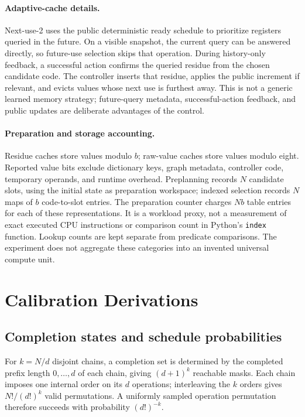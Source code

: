 \paragraph{Adaptive-cache details.}
Next-use-2 uses the public deterministic ready schedule to prioritize
registers queried in the future. On a visible snapshot, the current query
can be answered directly, so future-use selection skips that operation.
During history-only feedback, a successful action confirms the queried
residue from the chosen candidate code. The controller inserts that
residue, applies the public increment if relevant, and evicts values
whose next use is furthest away. This is not a generic learned memory
strategy; future-query metadata, successful-action feedback, and public
updates are deliberate advantages of the control.

\paragraph{Preparation and storage accounting.}
Residue caches store values modulo $b$; raw-value caches store values
modulo eight. Reported value bits exclude dictionary keys, graph metadata,
controller code, temporary operands, and runtime overhead. Preplanning
records $N$ candidate slots, using the initial state as preparation
workspace; indexed selection records $N$ maps of $b$ code-to-slot entries.
The preparation counter charges $Nb$ table entries for each of these
representations. It is a workload proxy, not a measurement of exact executed
CPU instructions or comparison count in Python's \texttt{index} function.
Lookup counts are kept separate from predicate comparisons. The experiment
does not aggregate these categories into an invented universal compute unit.

\section{Calibration Derivations}
\label{app:proofs}
\subsection{Completion states and schedule probabilities}
For $k=N/d$ disjoint chains, a completion set is determined by the completed
prefix length $0,\ldots,d$ of each chain, giving $(d+1)^k$ reachable masks.
Each chain imposes one internal order on its $d$ operations; interleaving
the $k$ orders gives $N!/(d!)^k$ valid permutations. A uniformly sampled
operation permutation therefore succeeds with probability $(d!)^{-k}$.

